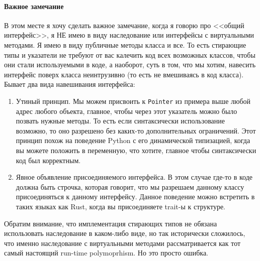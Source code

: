 \paragraph{Важное замечание}

В этом месте я хочу сделать важное замечание, когда я говорю про <<общий интерфейс>>, я НЕ имею в виду наследование или интерфейсы с виртуальными методами.
Я имею в виду публичные методы класса и все.
То есть стирающие типы и указатели не требуют от вас калечить код всех возможных классов, чтобы они стали используемыми в коде, а наоборот, суть в том, что мы хотим, навесить интерфейс поверх класса неинтрузивно (то есть не вмешиваясь в код класса).
Бывает два вида навешивания интерфейса:
\begin{enumerate}
\item Утиный принцип.
Мы можем присвоить к \texttt{Pointer} из примера выше любой адрес любого объекта, главное, чтобы через этот указатель можно было позвать нужные методы.
То есть если синтаксически использование возможно, то оно разрешено без каких-то дополнительных ограничений.
Этот принцип похож на поведение Python с его динамической типизацией, когда вы можете положить в переменную, что хотите, главное чтобы синтаксически код был корректным.

\item Явное объявление присоединяемого интерфейса.
В этом случае где-то в коде должна быть строчка, которая говорит, что мы разрешаем данному классу присоединяться к данному интерфейсу.
Данное поведение можно встретить в таких языках как Rust, когда вы присоединяете trait-ы к структуре.
\end{enumerate}
Обратим внимание, что имплементация стирающих типов не обязана использовать наследование в каком-либо виде, но так исторически сложилось, что именно наследование с виртуальными методами рассматривается как тот самый настоящий run-time polymoprhism.
Но это просто ошибка.
